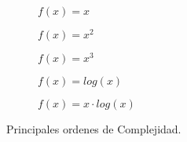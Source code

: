 \begin{figure}[h]
\centering
\begin{subfigure}[A]{0.45\textwidth}
\centering


\caption{$f(x) = x$}

\end{subfigure}%
\quad
\begin{subfigure}[B]{0.45\textwidth}
\centering


\caption{$f(x) = x^2$}

\end{subfigure}%
\quad
\begin{subfigure}[C]{0.45\textwidth}
\centering


\caption{$f(x) = x^3$}

\end{subfigure}%
\quad
\begin{subfigure}[D]{0.45\textwidth}
\centering


\caption{$f(x) = log(x)$}

\end{subfigure}%
\quad
\begin{subfigure}[E]{0.45\textwidth}
\centering


\caption{$f(x) = x \cdot log(x)$}

\end{subfigure}

\caption{Principales ordenes de Complejidad.}

\end{figure}